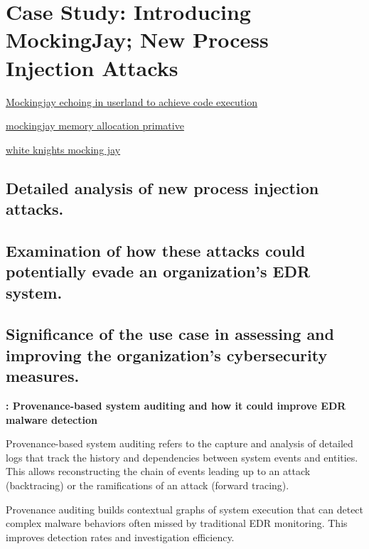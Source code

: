 \section{Case Study: Introducing MockingJay; New Process Injection Attacks}

\href{https://www.securityjoes.com/post/process-mockingjay-echoing-rwx-in-userland-to-achieve-code-execution}{Mockingjay echoing in userland to achieve code execution}

\href{https://www.linkedin.com/posts/john-stigerwalt-90a9b4110_mockingjay-memory-allocation-primitive-activity-7083050050158743552-Hgyw}{mockingjay memory allocation primative}

\href{https://whiteknightlabs.com/2023/07/06/mockingjay-memory-allocation-primitive/}{white knights mocking jay}

\subsection{Detailed analysis of new process injection attacks.}

\subsection{Examination of how these attacks could potentially evade an organization's EDR system.}

\subsection{Significance of the use case in assessing and improving the organization's cybersecurity measures.}

\textbf{\textcite{Inam:2023}: Provenance-based system auditing and how it could improve EDR malware detection}

Provenance-based system auditing refers to the capture and analysis of detailed logs that track the history and dependencies between system events and entities. This allows reconstructing the chain of events leading up to an attack (backtracing) or the ramifications of an attack (forward tracing).

Provenance auditing builds contextual graphs of system execution that can detect complex malware behaviors often missed by traditional EDR monitoring. This improves detection rates and investigation efficiency.
